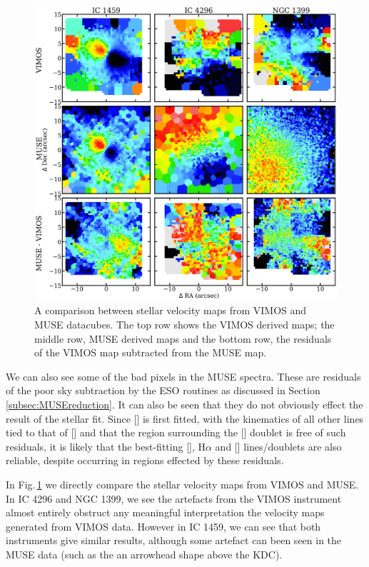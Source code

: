 			\begin{figure}[t!]
				\centering
				\includegraphics[width=.9\textwidth]{chapter4/compare_velfield.png}
				\caption[Comparison between stellar velocity maps from VIMOS and MUSE datacubes]{A comparison between stellar velocity maps from VIMOS and MUSE datacubes. The top row shows the VIMOS derived maps; the middle row, MUSE derived maps and the bottom row, the residuals of the VIMOS map subtracted from the MUSE map.}
				\label{fig:compare_velfield}
			\end{figure}

			We can also see some of the bad pixels in the MUSE spectra. These are residuals of the poor sky subtraction by the ESO routines as discussed in Section \ref{subsec:MUSEreduction}. It can also be seen that they do not obviously effect the result of the stellar fit. Since [] is first fitted, with the kinematics of all other lines tied to that of [] and that the region surrounding the [] doublet is free of such residuals, it is likely that the best-fitting [], H$\alpha$ and [] lines/doublets are also reliable, despite occurring in regions effected by these residuals.

			In Fig.\,\ref{fig:compare_velfield} we directly compare the stellar velocity maps from VIMOS and MUSE. In IC 4296 and NGC 1399, we see the artefacts from the VIMOS instrument almost entirely obstruct any meaningful interpretation the velocity maps generated from VIMOS data. However in IC 1459, we can see that both instruments give similar results, although some artefact can been seen in the MUSE data (such as the an arrowhead shape above the KDC).  

